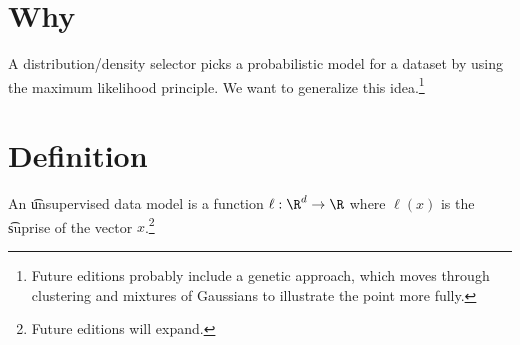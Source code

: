 

\section*{Why}

A distribution/density selector picks a probabilistic model for a dataset by using the maximum likelihood principle.
We want to generalize this idea.\footnote{Future editions probably include a genetic approach, which moves through clustering and mixtures of Gaussians to illustrate the point more fully.}

\section*{Definition}

An \t{unsupervised data model} is a function $\ell : \R ^d \to \R $ where $\ell (x)$ is the \t{suprise} of the vector $x$.\footnote{Future editions will expand.}

\blankpage